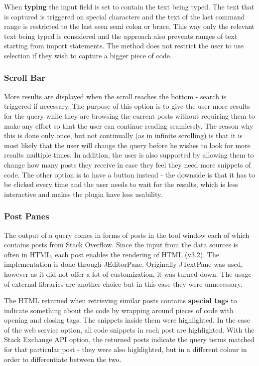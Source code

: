 \documentclass{l4proj}
\begin{document}
\noindent
When \textbf{typing} the input field is set to contain the text being typed. The text that is captured is triggered on special characters and the text of the last command range is restricted to the last seen semi colon or brace. This way only the relevant text being typed is considered and the approach also prevents ranges of text starting from import statements. The method does not restrict the user to use selection if they wish to capture a bigger piece of code.  

\subsubsection{Scroll Bar}
More results are displayed when the scroll reaches the bottom - search is triggered if necessary. The purpose of this option is to  give the user more results for the query while they are browsing the current posts without requiring them to make any effort so that the user can continue reading seamlessly. The reason why this is done only once, but not continually (as in infinite scrolling) is that it is most likely that the user will change the query before he wishes to look for more results multiple times. In addition, the user is also supported by allowing them to change how many posts they receive in case they feel they need more snippets of code. The other option is to have a button instead - the downside is that it has to be clicked every time and the user needs to wait for the results, which is less interactive and makes the plugin have less usability.

\subsubsection{Post Panes}
The output of a query comes in forms of posts in the tool window each of which contains posts from Stack Overflow. Since the input from the data sources is often in HTML, each post enables the rendering of HTML (v3.2). The implementation is done through JEditorPane. Originally JTextPane was used, however as it did not offer a lot of customization, it was  turned down. The usage of external libraries are another choice but in this case they were unnecessary. 

\noindent
The HTML returned when retrieving similar posts contains \textbf{special tags} to indicate something about the code by wrapping around pieces of code with opening and closing tags. The snippets inside them were highlighted. In the case of the web service option, all code snippets in each post are highlighted. With the Stack Exchange API option, the returned posts indicate the query terms matched for that particular post - they were also highlighted, but in a different colour in order to differentiate between the two. 
\end{document}
